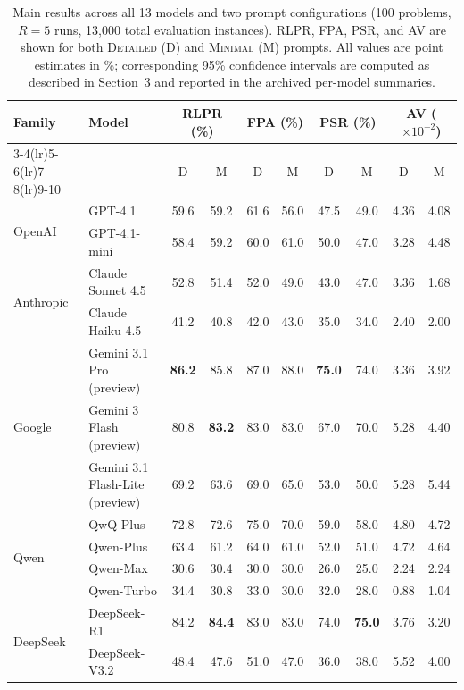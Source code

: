 \documentclass[11pt]{article}
\begin{document}
\begin{table}[t]
\centering
\small
\caption{Main results across all 13 models and two prompt configurations (100 problems, $R=5$ runs, 13{,}000 total evaluation instances). RLPR, FPA, PSR, and AV are shown for both \textsc{Detailed} (D) and \textsc{Minimal} (M) prompts. All values are point estimates in \%; corresponding 95\% confidence intervals are computed as described in Section~3 and reported in the archived per-model summaries.}
\label{tab:overall-performance}
\setlength{\tabcolsep}{4pt}
\begin{tabular}{llcccccccc}
\toprule
\multirow{2}{*}{Family} & \multirow{2}{*}{Model}
  & \multicolumn{2}{c}{RLPR (\%)}
  & \multicolumn{2}{c}{FPA (\%)}
  & \multicolumn{2}{c}{PSR (\%)}
  & \multicolumn{2}{c}{AV ($\times 10^{-2}$)} \\
\cmidrule(lr){3-4}\cmidrule(lr){5-6}\cmidrule(lr){7-8}\cmidrule(lr){9-10}
& & D & M & D & M & D & M & D & M \\
\midrule
\multirow{2}{*}{OpenAI}
  & GPT-4.1      & 59.6 & 59.2 & 61.6 & 56.0 & 47.5 & 49.0 & 4.36 & 4.08 \\
  & GPT-4.1-mini & 58.4 & 59.2 & 60.0 & 61.0 & 50.0 & 47.0 & 3.28 & 4.48 \\
\midrule
\multirow{2}{*}{Anthropic}
  & Claude Sonnet 4.5 & 52.8 & 51.4 & 52.0 & 49.0 & 43.0 & 47.0 & 3.36 & 1.68 \\
  & Claude Haiku 4.5  & 41.2 & 40.8 & 42.0 & 43.0 & 35.0 & 34.0 & 2.40 & 2.00 \\
\midrule
\multirow{3}{*}{Google}
  & Gemini 3.1 Pro (preview)        & \textbf{86.2} & 85.8 & 87.0 & 88.0 & \textbf{75.0} & 74.0 & 3.36 & 3.92 \\
  & Gemini 3 Flash (preview)        & 80.8 & \textbf{83.2} & 83.0 & 83.0 & 67.0 & 70.0 & 5.28 & 4.40 \\
  & Gemini 3.1 Flash-Lite (preview) & 69.2 & 63.6 & 69.0 & 65.0 & 53.0 & 50.0 & 5.28 & 5.44 \\
\midrule
\multirow{4}{*}{Qwen}
  & QwQ-Plus   & 72.8 & 72.6 & 75.0 & 70.0 & 59.0 & 58.0 & 4.80 & 4.72 \\
  & Qwen-Plus  & 63.4 & 61.2 & 64.0 & 61.0 & 52.0 & 51.0 & 4.72 & 4.64 \\
  & Qwen-Max   & 30.6 & 30.4 & 30.0 & 30.0 & 26.0 & 25.0 & 2.24 & 2.24 \\
  & Qwen-Turbo & 34.4 & 30.8 & 33.0 & 30.0 & 32.0 & 28.0 & 0.88 & 1.04 \\
\midrule
\multirow{2}{*}{DeepSeek}
  & DeepSeek-R1   & 84.2 & \textbf{84.4} & 83.0 & 83.0 & 74.0 & \textbf{75.0} & 3.76 & 3.20 \\
  & DeepSeek-V3.2 & 48.4 & 47.6 & 51.0 & 47.0 & 36.0 & 38.0 & 5.52 & 4.00 \\
\bottomrule
\end{tabular}
\end{table}
\end{document}
